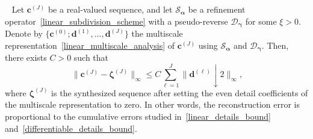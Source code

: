 \documentclass[10pt,a4paper]{amsart}
\begin{document}
\begin{theorem}~\label{thm:synthesis_theorem}
    Let $\boldsymbol{c}^{(J)}$ be a real-valued sequence, and let $\mathcal{S}_{\boldsymbol{\alpha}}$ be a refinement operator~\eqref{linear_subdivision_scheme} with a pseudo-reverse $\mathcal{D}_{\boldsymbol{\gamma}}$ for some $\xi>0$. Denote by $\{\boldsymbol{c}^{(0)};\boldsymbol{d}^{(1)},\dots,\boldsymbol{d}^{(J)}\}$ the multiscale representation~\eqref{linear_multiscale_analysis} of $\boldsymbol{c}^{(J)}$ using $\mathcal{S}_{\boldsymbol{\alpha}}$ and $ \mathcal{D}_{\boldsymbol{\gamma}}$. Then, there exists $C>0$ such that
    \begin{equation}~\label{synthesis_bound}
        \|\boldsymbol{c}^{(J)} - \boldsymbol{\zeta}^{(J)}\|_\infty \leq C\sum_{\ell=1}^{J}\|\boldsymbol{d}^{(\ell)}\downarrow 2\|_\infty,
    \end{equation}
    where $\boldsymbol{\zeta}^{(J)}$ is the synthesized sequence after setting the even detail coefficients of the multiscale representation to zero. In other words, the reconstruction error is proportional to the cumulative errors studied in~\eqref{linear_details_bound} and~\eqref{differentiable_details_bound}.
\end{theorem}
\end{document}

